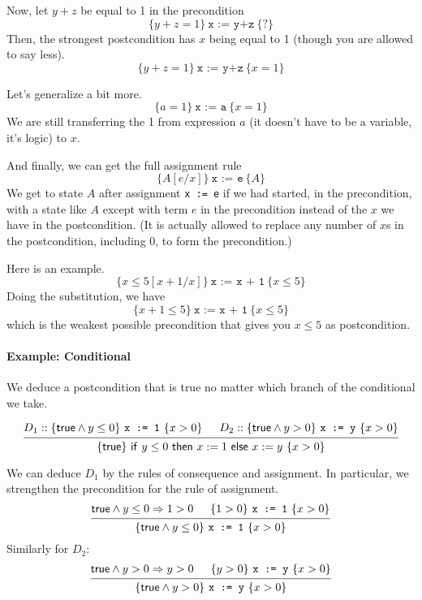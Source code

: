 \documentclass[11pt]{article}
\begin{document}
Now, let $y+z$ be equal to 1 in the precondition
\[
\{ y+z = 1 \} ~\texttt{x := y+z}~ \{ ? \}
\]
Then, the strongest postcondition has $x$ being equal to 1 (though you are allowed to say less).
\[
\{ y+z = 1 \} ~\texttt{x := y+z}~ \{ x = 1 \}
\]

Let's generalize a bit more.
\[
\{ a = 1 \} ~\texttt{x := a}~ \{ x = 1 \}
\]
We are still transferring the 1 from expression $a$ (it doesn't have to be a variable, it's logic) to $x$.

And finally, we can get the full assignment rule
\[
\{A[e/x]\}~\texttt{x := e}~\{A\}
\]
We get to state $A$ after assignment \texttt{x := e} if we had started, in the precondition, with a state like $A$ except with term $e$ in the precondition instead of the $x$ we have in the postcondition.
(It is actually allowed to replace any number of $x$s in the postcondition, including 0, to form the precondition.)

Here is an example.
\[
\{x \leq 5[x+1/x]\}~\texttt{x := x + 1}~\{ x \leq 5\}
\]
Doing the substitution, we have
\[
\{x+1 \leq 5\}~\texttt{x := x + 1}~\{ x \leq 5\}
\]
which is the weakest possible precondition that gives you $x \leq 5$ as postcondition.

\paragraph{Example: Conditional} We deduce a postcondition that is true no matter which branch of the conditional we take.

\[
\begin{prooftree}
  \hypo{D_1:: \{ \mathsf{true} \wedge y \leq 0 \} ~ \texttt{x := 1} ~ \{ x > 0 \}}
  \hypo{D_2:: \{ \mathsf{true} \wedge y > 0 \} ~ \texttt{x := y} ~ \{ x > 0 \}}
  \infer2{ \{ \mathsf{true} \} \mathsf{~if~} y \leq 0 \mathsf{~then~} x := 1 \mathsf{~else~} x := y ~ \{ x > 0 \}}
\end{prooftree}
\]

We can deduce $D_1$ by the rules of consequence and assignment. In particular, we strengthen the precondition
for the rule of assignment.
\[
\begin{prooftree}
  \hypo{\mathsf{true} \wedge y \leq 0 \Rightarrow 1 > 0}
  \hypo{\{ 1 > 0 \} ~ \texttt{x := 1} ~ \{ x > 0 \}}
  \infer2{\{ \mathsf{true} \wedge y \leq 0 \} ~ \texttt{x := 1} ~ \{ x > 0 \}}
\end{prooftree}
\]
Similarly for $D_2$:
\[
\begin{prooftree}
  \hypo{\mathsf{true} \wedge y > 0 \Rightarrow y > 0}
  \hypo{\{ y > 0 \} ~ \texttt{x := y} ~ \{ x > 0 \}}
  \infer2{\{ \mathsf{true} \wedge y > 0 \} ~ \texttt{x := y} ~ \{ x > 0 \}}
\end{prooftree}
\]
\end{document}
